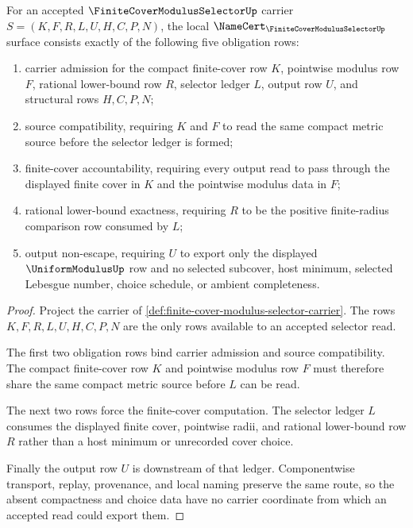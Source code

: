 \begin{theorem}
\label{thm:finite-cover-modulus-selector-namecert-obligations}
For an accepted $\FiniteCoverModulusSelectorUp$ carrier $S=(K,F,R,L,U,H,C,P,N)$, the local $\NameCert_{\FiniteCoverModulusSelectorUp}$ surface consists exactly of the following five obligation rows:
\begin{enumerate}
\item carrier admission for the compact finite-cover row $K$, pointwise modulus row $F$, rational lower-bound row $R$, selector ledger $L$, output row $U$, and structural rows $H,C,P,N$;
\item source compatibility, requiring $K$ and $F$ to read the same compact metric source before the selector ledger is formed;
\item finite-cover accountability, requiring every output read to pass through the displayed finite cover in $K$ and the pointwise modulus data in $F$;
\item rational lower-bound exactness, requiring $R$ to be the positive finite-radius comparison row consumed by $L$;
\item output non-escape, requiring $U$ to export only the displayed $\UniformModulusUp$ row and no selected subcover, host minimum, selected Lebesgue number, choice schedule, or ambient completeness.
\end{enumerate}
\end{theorem}
\begin{proof}
Project the carrier of \autoref{def:finite-cover-modulus-selector-carrier}. The rows $K,F,R,L,U,H,C,P,N$ are the only rows available to an accepted selector read.

The first two obligation rows bind carrier admission and source compatibility. The compact finite-cover row $K$ and pointwise modulus row $F$ must therefore share the same compact metric source before $L$ can be read.

The next two rows force the finite-cover computation. The selector ledger $L$ consumes the displayed finite cover, pointwise radii, and rational lower-bound row $R$ rather than a host minimum or unrecorded cover choice.

Finally the output row $U$ is downstream of that ledger. Componentwise transport, replay, provenance, and local naming preserve the same route, so the absent compactness and choice data have no carrier coordinate from which an accepted read could export them.
\end{proof}

